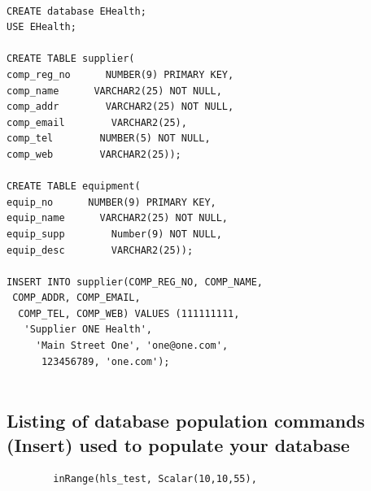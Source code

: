 \documentclass{article}
\begin{document}
\begin{lstlisting}

CREATE database EHealth;
USE EHealth;

CREATE TABLE supplier(
comp_reg_no      NUMBER(9) PRIMARY KEY,
comp_name      VARCHAR2(25) NOT NULL,
comp_addr        VARCHAR2(25) NOT NULL,
comp_email        VARCHAR2(25),
comp_tel        NUMBER(5) NOT NULL,
comp_web        VARCHAR2(25));

CREATE TABLE equipment(
equip_no      NUMBER(9) PRIMARY KEY,
equip_name      VARCHAR2(25) NOT NULL,
equip_supp        Number(9) NOT NULL,
equip_desc        VARCHAR2(25));

INSERT INTO supplier(COMP_REG_NO, COMP_NAME,
 COMP_ADDR, COMP_EMAIL,
  COMP_TEL, COMP_WEB) VALUES (111111111,
   'Supplier ONE Health',
	 'Main Street One', 'one@one.com',
	  123456789, 'one.com');


\end{lstlisting}

\subsection{Listing of database population commands (Insert) used to populate your database}











\begin{lstlisting}
		inRange(hls_test, Scalar(10,10,55), 
\end{lstlisting}
\end{document}
